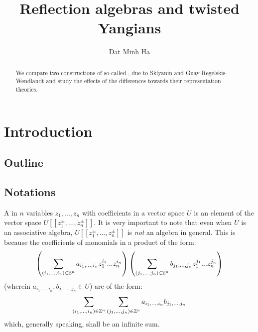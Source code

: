 

\setcounter{section}{-1}


\newcommand{\scattering}{\mathrm{B_{sc}}} %
\newcommand{\symmetric}{\mathrm{B_{sym}}} %



    \title{Reflection algebras and twisted Yangians}
    
    \author{Dat Minh Ha}
    \maketitle
    
    \begin{abstract}
        We compare two constructions of so-called , due to Sklyanin and Guay-Regelskis-Wendlandt and study the effects of the differences towards their representation theories.
    \end{abstract}
    
    {
    \hypersetup{} 
    \tableofcontents %
    }

    \listoftodos

    \section{Introduction}
        \subsection{Outline}

        \subsection{Notations}
            A  in $n$ variables $z_1, ..., z_n$ with coefficients in a vector space $U$ is an element of the vector space $U[\![z_1^{\pm}, ..., z_n^{\pm}]\!]$. It is very important to note that even when $U$ is an associative algebra, $U[\![z_1^{\pm}, ..., z_n^{\pm}]\!]$ is \textit{not} an algebra in general. This is because the coefficients of monomials in a product of the form:
                $$\left( \sum_{(i_1, ..., i_n) \in \mathbb{Z}^n} a_{i_1, ..., i_n} z_1^{i_1} ... z_n^{i_n} \right) \left( \sum_{(j_1, ..., j_n) \in \mathbb{Z}^n} b_{j_1, ..., j_n} z_1^{j_1} ... z_n^{j_n} \right)$$
            (wherein $a_{i_1, ..., i_n}, b_{j_1, ..., j_n} \in U$) are of the form:
                $$\sum_{(i_1, ..., i_n) \in \mathbb{Z}^n} \sum_{(j_1, ..., j_n) \in \mathbb{Z}^n} a_{i_1, ..., i_n} b_{j_1, ..., j_n}$$
            which, generally speaking, shall be an infinite sum.

